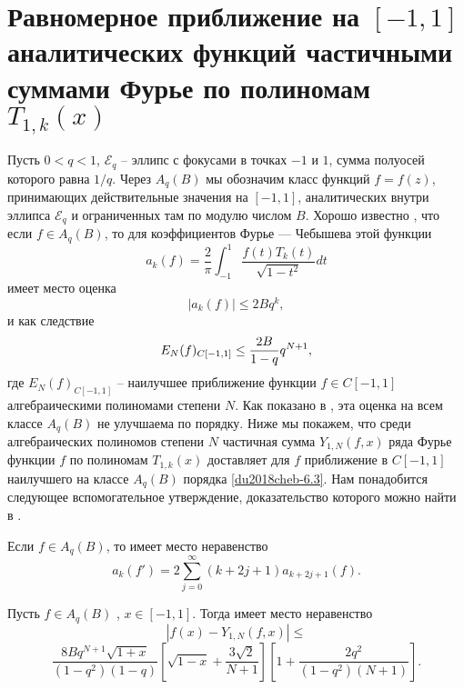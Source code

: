 \section{Равномерное приближение на $[-1,1]$ аналитических функций частичными суммами Фурье по полиномам $T_{1,k}(x)$}
Пусть $0<q<1$, $\mathcal{E}_q$ -- эллипс с фокусами в точках
$-1$ и $1$, сумма полуосей которого равна $1/q$.
Через $A_q(B)$ мы обозначим класс функций $f=f(z)$,
принимающих действительные значения на $[-1,1]$, аналитических
внутри эллипса $\mathcal{E}_q$ и ограниченных там по модулю числом
$B$. Хорошо известно \cite{du2018cheb-Timan}, что если
$f\in A_q(B)$, то для коэффициентов Фурье --- Чебышева этой функции
\begin{equation}\label{du2018cheb-6.1}
a_k(f)=\frac{2}{\pi}\int_{-1}^{1}\frac{f(t)T_k(t)}{\sqrt{1-t^2}}dt
\end{equation}
имеет место оценка
\begin{equation}\label{du2018cheb-6.2}
|a_k(f)|\le2Bq^k,
\end{equation}
и как следствие
\begin{equation}\label{du2018cheb-6.3}
E_N(f)_{C[-1,1]}\le{2B\over1-q}q^{N+1},
\end{equation}
где $E_N(f)_{C[-1,1]}$ -- наилучшее приближение функции $f\in C[-1,1]$ алгебраическими полиномами степени $N$. Как показано в \cite{du2018cheb-Ahiezer}, эта оценка на всем классе  $A_q(B)$ не улучшаема по порядку.  Ниже мы  покажем, что среди алгебраических полиномов степени $N$ частичная сумма $Y_{1,N}(f,x)$ ряда Фурье функции $f$ по полиномам $T_{1,k}(x)$    доставляет для $f$ приближение в $C[-1,1]$ наилучшего на классе $A_q(B)$ порядка \eqref{du2018cheb-6.3}. Нам понадобится следующее    вспомогательное утверждение, доказательство которого можно найти  в \cite{du2018cheb-Pash}.
\begin{lemma}\label{du2018cheb-lemC} Если $f\in A_q(B)$, то имеет место неравенство
	$$
	a_k(f')=2\sum_{j=0}^\infty(k+2j+1)a_{k+2j+1}(f).
	$$
\end{lemma}

\begin{theorem} \label{du2018cheb-th4}    Пусть  $f\in A_q(B)$ , $x\in[-1,1]$. Тогда имеет  место неравенство
	$$
	|f(x)- Y_{1,N}(f,x)|\le
	$$
	$$
	\frac{8Bq^{N+1}\sqrt{1+x}}{(1-q^2)(1-q)}\left[\sqrt{1-x}+\frac{3\sqrt{2}}{N+1}\right]\left[1+
	\frac{2q^2}{(1-q^2)(N+1)}\right].
	$$
\end{theorem}



